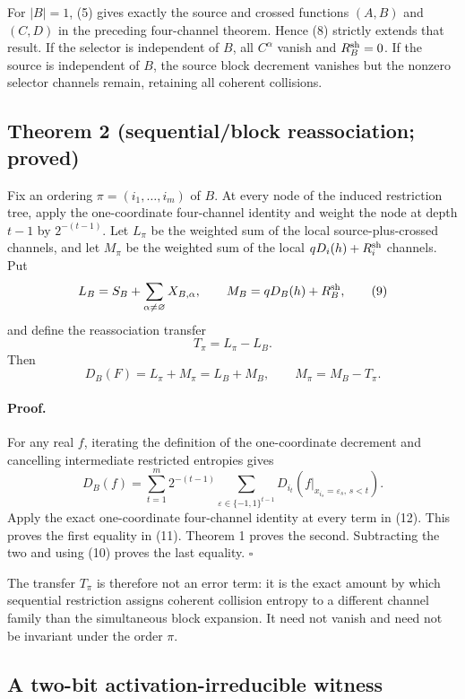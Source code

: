For $|B|=1$, (5) gives exactly the source and crossed functions
$(A,B)$ and $(C,D)$ in the preceding four-channel theorem.  Hence (8)
strictly extends that result.  If the selector is independent of $B$, all
$C^\alpha$ vanish and $R_B^{\rm sh}=0$.  If the source is independent of
$B$, the source block decrement vanishes but the nonzero selector channels
remain, retaining all coherent collisions.

\subsection*{Theorem 2 (sequential/block reassociation; proved)}

Fix an ordering $\pi=(i_1,\dots,i_m)$ of $B$.  At every node of the induced
restriction tree, apply the one-coordinate four-channel identity and weight
the node at depth $t-1$ by $2^{-(t-1)}$.  Let $L_\pi$ be the weighted sum of
the local source-plus-crossed channels, and let $M_\pi$ be the weighted sum
of the local $qD_i(h)+R_i^{\rm sh}$ channels.  Put
\[
 L_B=S_B+\sum_{\alpha\ne\varnothing}X_{B,\alpha},\qquad
 M_B=qD_B(h)+R_B^{\rm sh},
\tag{9}
\]
and define the reassociation transfer
\[
 T_\pi=L_\pi-L_B.
\tag{10}
\]
Then
\[
 D_B(F)=L_\pi+M_\pi=L_B+M_B,
 \qquad M_\pi=M_B-T_\pi.
\tag{11}
\]

\paragraph{Proof.}
For any real $f$, iterating the definition of the one-coordinate decrement
and cancelling intermediate restricted entropies gives
\[
 D_B(f)=\sum_{t=1}^m2^{-(t-1)}
   \sum_{\varepsilon\in\{-1,1\}^{t-1}}
   D_{i_t}(f|_{x_{i_s}=\varepsilon_s,\,s<t}).
\tag{12}
\]
Apply the exact one-coordinate four-channel identity at every term in (12).
This proves the first equality in (11).  Theorem 1 proves the second.
Subtracting the two and using (10) proves the last equality. \(\square\)

The transfer $T_\pi$ is therefore not an error term: it is the exact amount
by which sequential restriction assigns coherent collision entropy to a
different channel family than the simultaneous block expansion.  It need
not vanish and need not be invariant under the order $\pi$.

\subsection*{A two-bit activation-irreducible witness}

